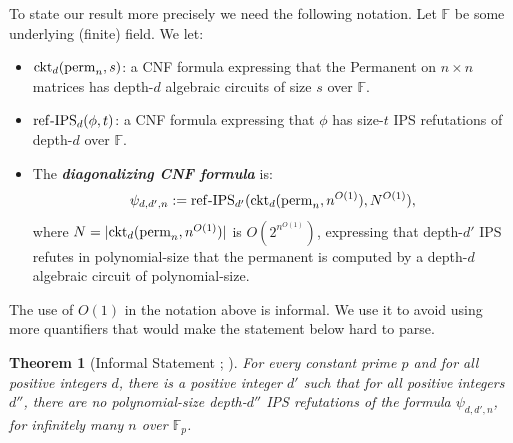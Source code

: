 \documentclass[11pt,letter]{article}
\newtheorem{theorem}{Theorem}[section]
\theoremstyle{remark} %
\newcommand{\perm}{{\rm perm}}
\begin{document}
To state our result more precisely we need the following notation. Let $\mathbb{F}$ be some underlying (finite) field. We let:
\begin{itemize}
    \item ${\rm ckt}_d(\perm_n,s)$: a CNF formula expressing that the Permanent on $n \times n$ matrices has depth-$d$ algebraic circuits of size $s$ over $\mathbb{F}$.
    
    
    \item ${\rm ref\text{-}IPS}_{d}(\phi, t)$: a CNF formula expressing that $\phi$ has size-$t$ IPS refutations of depth-$d$ over $\mathbb{F}$.

    \item The {\bf \textit{diagonalizing CNF formula}} is:
        $$\psi_{d,d',n} := 
        {\rm ref\text{-}IPS}_{d'}%
        ({\rm ckt}_d(%
                        \perm_n, n^{O(1)}
                    )%
        , N^{O(1)}%
        ),%
        $$  
        where $N = |{\rm ckt}_d(\perm_n, n^{O(1)})|$ is $O(2^{n^{O(1)}})$, expressing that depth-$d'$ IPS refutes in polynomial-size that the permanent is computed by a depth-$d$ algebraic circuit of polynomial-size.
\end{itemize}
The use of $O(1)$ in the notation above is informal. We use it to avoid using more quantifiers that would make the statement below hard to parse. 
 

\begin{theorem}[Informal Statement%
        ; %
            ]
    \label{thm:mainthm2}
    For every constant prime $p$ and for all positive integers $d$, there is a positive integer $d'$ such that for all positive integers $d''$, there are no polynomial-size depth-$d''$ IPS refutations of the formula 
    $
    \psi_{d,d',n} 
    $, 
    for infinitely many $n$ over $\mathbb{F}_{p}$.
\end{theorem}
\end{document}

